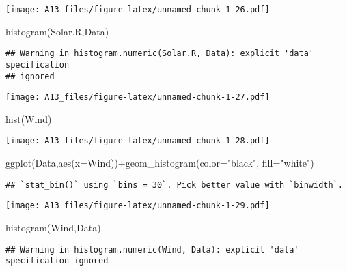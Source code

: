 \documentclass[
]{article}
\newenvironment{Shaded}{\begin{snugshade}}{\end{snugshade}}
\newcommand{\AttributeTok}[1]{\textcolor[rgb]{0.77,0.63,0.00}{#1}}
\newcommand{\FunctionTok}[1]{\textcolor[rgb]{0.00,0.00,0.00}{#1}}
\newcommand{\NormalTok}[1]{#1}
\newcommand{\SpecialCharTok}[1]{\textcolor[rgb]{0.00,0.00,0.00}{#1}}
\newcommand{\StringTok}[1]{\textcolor[rgb]{0.31,0.60,0.02}{#1}}
\begin{document}
\texttt{[image: A13\_files/figure-latex/unnamed-chunk-1-26.pdf]}

\begin{Shaded}
\begin{Highlighting}[]
\FunctionTok{histogram}\NormalTok{(Solar.R,Data)}
\end{Highlighting}
\end{Shaded}

\begin{verbatim}
## Warning in histogram.numeric(Solar.R, Data): explicit 'data' specification
## ignored
\end{verbatim}

\texttt{[image: A13\_files/figure-latex/unnamed-chunk-1-27.pdf]}

\begin{Shaded}
\begin{Highlighting}[]
\FunctionTok{hist}\NormalTok{(Wind)}
\end{Highlighting}
\end{Shaded}

\texttt{[image: A13\_files/figure-latex/unnamed-chunk-1-28.pdf]}

\begin{Shaded}
\begin{Highlighting}[]
\FunctionTok{ggplot}\NormalTok{(Data,}\FunctionTok{aes}\NormalTok{(}\AttributeTok{x=}\NormalTok{Wind))}\SpecialCharTok{+}\FunctionTok{geom\_histogram}\NormalTok{(}\AttributeTok{color=}\StringTok{"black"}\NormalTok{, }\AttributeTok{fill=}\StringTok{"white"}\NormalTok{)}
\end{Highlighting}
\end{Shaded}

\begin{verbatim}
## `stat_bin()` using `bins = 30`. Pick better value with `binwidth`.
\end{verbatim}

\texttt{[image: A13\_files/figure-latex/unnamed-chunk-1-29.pdf]}

\begin{Shaded}
\begin{Highlighting}[]
\FunctionTok{histogram}\NormalTok{(Wind,Data)}
\end{Highlighting}
\end{Shaded}

\begin{verbatim}
## Warning in histogram.numeric(Wind, Data): explicit 'data' specification ignored
\end{verbatim}
\end{document}
